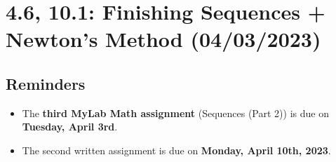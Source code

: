 \documentclass{report}
\newtheorem{thm}{Theorem}
\begin{document}
\begin{sloppypar}
\begin{center}
\end{center}




\chapter{4.6, 10.1: Finishing Sequences +  Newton's Method (04/03/2023)}
\section{Reminders}
\begin{itemize}
  \item The \textbf{third MyLab Math assignment} (Sequences
        (Part 2)) is due on \textbf{Tuesday, April 3rd}.
  \item The second written assignment is due on \textbf{
        Monday, April 10th, 2023}.
\end{itemize}

\end{sloppypar}
\end{document}
